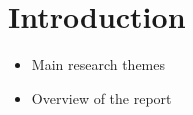 \chapter*{Introduction}


\begin{itemize}
	\item Main research themes
	\item Overview of the report
\end{itemize}
